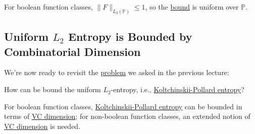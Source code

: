 \begin{eg}
	For boolean function classes, \(\lVert F \rVert _{L_2(\mathbb{P} )} \leq 1\), so the \hyperref[thm:uniform-entropy-integral-bound]{bound} is uniform over \(\mathbb{P} \).
\end{eg}

\subsection{Uniform \(L_2\) Entropy is Bounded by Combinatorial Dimension}
We're now ready to revisit the \hyperref[prb:lec13]{problem} we asked in the previous lecture:

\begin{problem*}
	How can be bound the uniform \(L_2\)-entropy, i.e., \hyperref[def:Koltchinskii-Pollard-entropy]{Koltchinskii-Pollard entropy}?
\end{problem*}
\begin{answer}
	For boolean function classes, \hyperref[def:Koltchinskii-Pollard-entropy]{Koltchinskii-Pollard entropy} can be bounded in terms of \hyperref[def:VC-dimension]{VC dimension}; for non-boolean function classes, an extended notion of \hyperref[def:VC-dimension]{VC dimension} is needed.
\end{answer}


